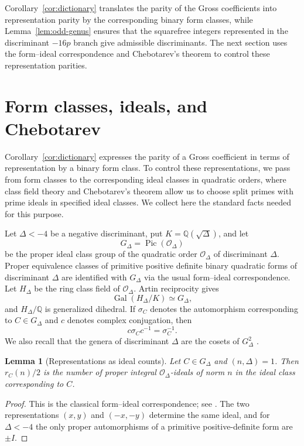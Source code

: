 \documentclass[10pt,a4paper]{amsart}
\newtheorem{lemma}[theorem]{Lemma}
\newcommand{\Q}{\mathbb{Q}}
\newcommand{\OO}{\mathcal{O}}
\newcommand{\Pic}{\operatorname{Pic}}
\newcommand{\Gal}{\operatorname{Gal}}
\begin{document}
Corollary~\ref{cor:dictionary} translates the parity of the Gross
coefficients into representation parity by the corresponding binary form
classes, while Lemma~\ref{lem:odd-genus} ensures that the squarefree
integers represented in the discriminant $-16p$ branch give admissible
discriminants. The next section uses the form--ideal correspondence and
Chebotarev's theorem to control these representation parities.

\section{Form classes, ideals, and Chebotarev}\label{sec:classfield}

Corollary~\ref{cor:dictionary} expresses the parity of a Gross coefficient
in terms of representation by a binary form class. To control these
representations, we pass from form classes to the corresponding ideal classes
in quadratic orders, where class field theory and Chebotarev's theorem allow
us to choose split primes with prime ideals in specified ideal classes.
We collect here the standard facts needed for this purpose.

Let $\Delta<-4$ be a negative discriminant, put
$K=\Q(\sqrt{\Delta})$, and let
\[
  G_\Delta=\Pic(\OO_\Delta)
\]
be the proper ideal class group of the quadratic order $\OO_\Delta$ of
discriminant $\Delta$. Proper equivalence classes of primitive positive
definite binary quadratic forms of discriminant $\Delta$ are identified
with $G_\Delta$ via the usual form--ideal correspondence.
Let $H_\Delta$ be the ring class field of $\OO_\Delta$. Artin reciprocity
gives
\[
  \Gal(H_\Delta/K)\simeq G_\Delta,
\]
and $H_\Delta/\Q$ is generalized dihedral. If $\sigma_C$ denotes the
automorphism corresponding to $C\in G_\Delta$ and $c$ denotes complex
conjugation, then
\[
  c\sigma_Cc^{-1}=\sigma_C^{-1}.
\]
We also recall that the genera of discriminant $\Delta$ are the cosets of
$G_\Delta^2$ \cite[Theorem~3.15]{Cox2013}.

\begin{lemma}[Representations as ideal counts]
\label{lem:representations-ideals}
Let $C\in G_\Delta$ and $(n,\Delta)=1$. Then $r_C(n)/2$ is the number of
proper integral $\OO_\Delta$-ideals of norm $n$ in the ideal class
corresponding to $C$.
\end{lemma}

\begin{proof}
This is the classical form--ideal correspondence; see
\cite[Theorem~7.7 and Chapter~9]{Cox2013}. The two representations
$(x,y)$ and $(-x,-y)$ determine the same ideal, and for $\Delta<-4$ the
only proper automorphisms of a primitive positive-definite form are
$\pm I$.
\end{proof}
\end{document}
